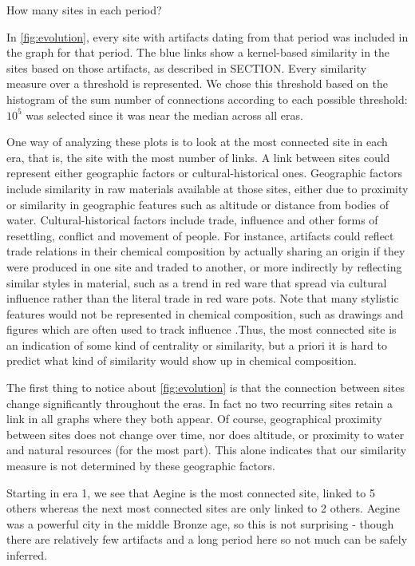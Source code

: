  How many sites in each period?
  
In \cref{fig:evolution}, every site with artifacts dating from that period was included in the graph for that period. The blue links show a kernel-based similarity in the sites based on those artifacts, as described in SECTION. Every similarity measure over a threshold is represented. We chose this threshold based on the histogram of the sum number of connections according to each possible threshold: $10^{5}$ was selected since it was near the median across all eras.

One way of analyzing these plots is to look at the most connected site in each era, that is, the site with the most number of links. A link between sites could represent either geographic factors or cultural-historical ones. Geographic factors include similarity in raw materials available at those sites, either due to proximity or similarity in geographic features such as altitude or distance from bodies of water. Cultural-historical factors include trade, influence and other forms of resettling, conflict and movement of people. For instance, artifacts could reflect trade relations in their chemical composition by actually sharing an origin if they were produced in one site and traded to another, or more indirectly by reflecting similar styles in material, such as a trend in red ware that spread via cultural influence rather than the literal trade in red ware pots.  Note that many stylistic features would not be represented in chemical composition, such as drawings and figures which are often used to track influence \cite{hruby2010mycenaean}.Thus, the most connected site is an indication of some kind of centrality or similarity, but a priori it is hard to predict what kind of similarity would show up in chemical composition.

The first thing to notice about \cref{fig:evolution} is that the connection between sites change significantly throughout the eras. In fact no two recurring sites retain a link in all graphs where they both appear. Of course, geographical proximity between sites does not change over time, nor does altitude, or proximity to water and natural resources (for the most part). This alone indicates that our similarity measure is not determined by these geographic factors. 

Starting in era 1, we see that Aegine is the most connected site, linked to 5 others whereas the next most connected sites are only linked to 2 others. Aegine was a powerful city in the middle Bronze age, so this is not surprising - though there are relatively few artifacts and a long period here so not much can be safely inferred. 

